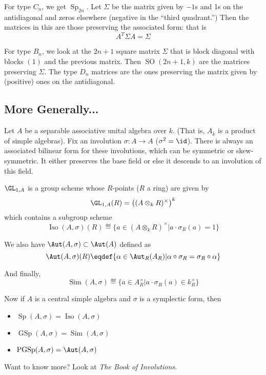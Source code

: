 \documentclass[12pt]{article}
\begin{document}
For type $C_n$, we get $\operatorname{Sp}_{2n}$. Let $\Sigma$ be the matrix given by $-1$s and 1s on the antidiagonal and zeros elsewhere (negative in the ``third quadrant.'')
Then the matrices in this are those preserving the associated form: that is 
\[A^T\Sigma A=\Sigma\]

For type $B_n$, we look at the $2n+1$ square matrix $\Sigma$ that is block diagonal with blocks $(1)$ and the previous matrix. Then $\operatorname{SO}(2n+1,k)$ are the matrices preserving $\Sigma$.
The type $D_n$ matrices are the ones preserving the matrix given by (positive) ones on the antidiagonal.

\subsection{More Generally...}
Let $A$ be a separable associative unital algebra over $k$. (That is, $A_{\bar k}$ is a product of simple algebras). Fix an involution $\sigma:A\to A$ 
($\sigma^2=\id$). There is always an associated bilinear form for these involutions, which can be symmetric or skew-symmetric. It either preserves the base field or else 
it descends to an involution of this field. 

\begin{defn}
	$\GL_{1,A}$ is a group scheme whose $R$-points ($R$ a ring) are given by 
	\[\GL_{1,A}(R)=\left((A\otimes_k R)^\times\right)^k\]
	which contains a subgroup scheme 
	\[\operatorname{Iso}(A,\sigma)(R)\eqdef \{a\in(A\otimes_k R)^\times|a\cdot\sigma_R(a)=1\}\]

	We also have $\Aut(A,\sigma)\subset \Aut(A)$ defined as 
	\[\Aut(A,\sigma)(R)\eqdef\{\alpha\in\Aut_R(A_R)|\alpha\circ\sigma_R=\sigma_R\circ\alpha\}\]

	And finally,
	\[\operatorname{Sim}(A,\sigma)\eqdef \{a\in A_R^\times|a\cdot\sigma_R(a)\in k_R^\times\}\]
\end{defn}

Now if $A$ is a central simple algebra and $\sigma$ is a symplectic form, then 
\begin{itemize}
	\item $\operatorname{Sp}(A,\sigma)=\operatorname{Iso}(A,\sigma)$
	\item $\operatorname{GSp}(A,\sigma)=\operatorname{Sim}(A,\sigma)$
	\item $\operatorname{PGSp}(A,\sigma)=\Aut(A,\sigma)$
\end{itemize}

Want to know more? Look at \textit{The Book of Involutions.}
\end{document}
